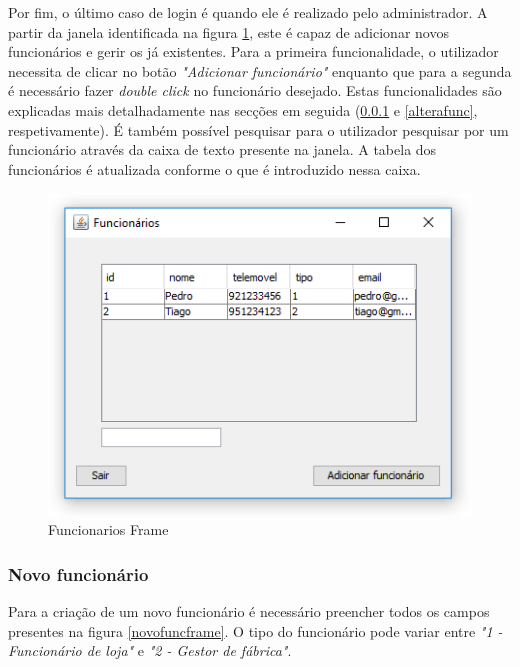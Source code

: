 \documentclass[11pt]{article} %
\begin{document}
Por fim, o último caso de login é quando ele é realizado pelo administrador. A partir da janela identificada na figura \ref{funcionariosframe}, este é capaz de adicionar novos funcionários e gerir os já existentes. Para a primeira funcionalidade, o utilizador necessita de clicar no botão \textit{"Adicionar funcionário"} enquanto que para a segunda é necessário fazer \textit{double click} no funcionário desejado. Estas funcionalidades são explicadas mais detalhadamente nas secções em seguida (\ref{novofunc} e \ref{alterafunc}, respetivamente). É também possível pesquisar para o utilizador pesquisar por um funcionário através da caixa de texto presente na janela. A tabela dos funcionários é atualizada conforme o que é introduzido nessa caixa.


\begin{figure}[H]
	\centering
	\includegraphics[]{funcionariosframe.png}
	\caption{Funcionarios Frame}
	\label{funcionariosframe}
\end{figure}

\subsubsection{Novo funcionário}
\label{novofunc}

Para a criação de um novo funcionário é necessário preencher todos os campos presentes na figura \ref{novofuncframe}. O tipo do funcionário pode variar entre \textit{"1 - Funcionário de loja"} e \textit{"2 - Gestor de fábrica"}.
\end{document}
